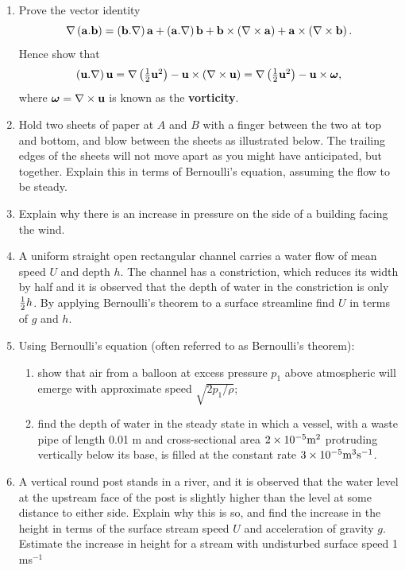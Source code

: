 \documentclass[twoside,a4paper,11pt]{report}
\begin{document}
\begin{enumerate}

\item Prove the vector identity
\[
\nabla \left( {{{\bf a}}. {{\bf b}}} \right)=\left( {{{\bf 
b}}. \nabla } \right){{\bf a}}+\left( {{{\bf a}}. \nabla } 
\right){{\bf b}}+{{\bf b}}\times \left( {\nabla \times {{\bf 
a}}} \right)+{{\bf a}}\times \left( {\nabla \times {{\bf b}}} 
\right).
\]
Hence show that 
\[
\left( {{{\bf u}}. \nabla } \right){{\bf u}}=\nabla \left( 
{\textstyle{1 \over 2}{{\bf u}}^2} \right)-{{\bf u}}\times \left( 
{\nabla \times {{\bf u}}} \right)=\nabla \left( {\textstyle{1 \over 
2}{{\bf u}}^2} \right)-{{\bf u}}\times {\bm\omega},
\]
where $ {\bm\omega}=\nabla \times {{\bf u}}$ is known as the \textbf{vorticity}.

\item Hold two sheets of paper at $A$ and $B$ with a finger between the two at top 
and bottom, and blow between the sheets as illustrated below. The trailing edges 
of the sheets will not move apart as you might have anticipated, but 
together. Explain this in terms of Bernoulli's equation, assuming the flow 
to be steady.

\item Explain why there is an increase in pressure on the side of a building 
facing the wind.

\item A uniform straight open rectangular channel carries a water flow of mean 
speed $U$ and depth $h$. The channel has a constriction, which reduces its width 
by half and it is observed that the depth of water in the constriction is 
only $\textstyle{1 \over 2}h$. By applying Bernoulli's theorem to a surface 
streamline find $U$ in terms of $g$ and $h$.

\item Using Bernoulli's equation (often referred to as Bernoulli's theorem):
\begin{enumerate}
\item show that air from a balloon at excess pressure $p_{1}$ above 
atmospheric will emerge with approximate speed $\sqrt {2p_1 /\rho } $;

\item find the depth of water in the steady state in which a vessel, with a 
waste pipe of length 0.01 m and cross-sectional area $2\times 
10^{-5}\hbox{m}^2$ protruding vertically below its base, is filled at the 
constant rate $3\times 10^{-5}\hbox{m}^3\hbox{s}^{-1}$.
\end{enumerate}

\item A vertical round post stands in a river, and it is observed that the 
water level at the upstream face of the post is slightly higher than the 
level at some distance to either side. Explain why this is so, and find the 
increase in the height in terms of the surface stream speed $U$ and 
acceleration of gravity $g$. Estimate the increase in height for a stream with 
undisturbed surface speed 1 ms$^{-1}$

\end{enumerate}
\end{document}
